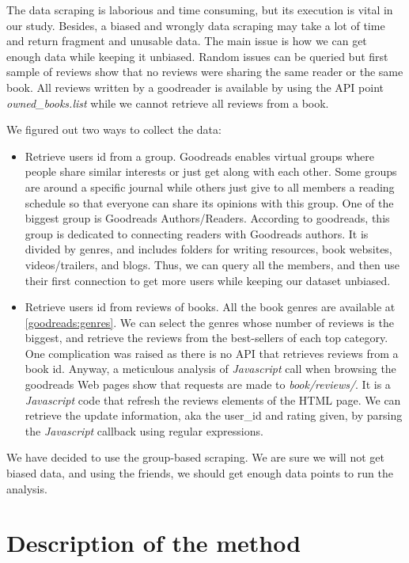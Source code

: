 \documentclass[11pt]{article}
\begin{document}
The data scraping is laborious and time consuming, but its execution is vital in our study. Besides, a biased and wrongly data scraping may take a lot of time and return fragment and unusable data.
The main issue is how we can get enough data while keeping it unbiased.
Random issues can be queried but first sample of reviews show that no reviews were sharing the same reader or the same book.
All reviews written by a goodreader is available by using the API point \textit{owned\_books.list} while we cannot retrieve all reviews from a book.


We figured out two ways to collect the data:
\begin{itemize}
\item Retrieve users id from a group.\newline
Goodreads enables virtual groups where people share similar interests or just get along with each other.
Some groups are around a specific journal while others just give to all members a reading schedule so that everyone can share its opinions with this group.
One of the biggest group is Goodreads Authors/Readers.
According to goodreads, this group is dedicated to connecting readers with Goodreads authors.
It is divided by genres, and includes folders for writing resources, book websites, videos/trailers, and blogs.
Thus, we can query all the members, and then use their first connection to get more users while keeping our dataset unbiased.
\item Retrieve users id from reviews of books.\newline
All the book genres are available at \ref{goodreads:genres}.
We can select the genres whose number of reviews is the biggest, and retrieve the reviews from the best-sellers of each top category.
One complication was raised as there is no API that retrieves reviews from a book id.
Anyway, a meticulous analysis of \textit{Javascript} call when browsing the goodreads Web pages show that requests are made to \textit{book/reviews/}.
It is a \textit{Javascript} code that refresh the reviews elements of the HTML page.
We can retrieve the update information, aka the user\_id and rating given, by parsing the \textit{Javascript} callback using regular expressions.
\end{itemize}


We have decided to use the group-based scraping.
We are sure we will not get biased data, and using the friends, we should get enough data points to run the analysis.

\section{Description of the method}
\end{document}
